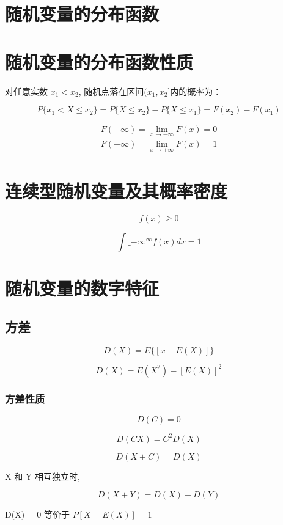 \section{随机变量的分布函数}

\section{随机变量的分布函数性质}

对任意实数 $x_1<x_2$, 随机点落在区间$( x_1 ,  x_2 ]$内的概率为：

$$
P\{ x_1<X  \le  x_2\} =P\{ X  \le   x_2 \} - P\{ X  \le   x_1 \}= F(x_2)-F(x_1)
$$

$$
\begin{array}{l}
F(-\infty)=\lim_{x \rightarrow-\infty} F(x)=0 \\
F(+\infty)=\lim_{x \rightarrow+\infty} F(x)=1
\end{array}
$$

\section{连续型随机变量及其概率密度}

$$ f(x) \geq 0 $$

$$ \int\_{-\infty}^{\infty} f(x) d x=1 $$


\section{随机变量的数字特征}

\subsection{方差}


$$
 D(X) = E \Big\{ [x-E(X)] \Big\}
$$

$$
 D(X) = E(X^2) - [E(X)] ^2
$$

\subsubsection{方差性质}

$$
 D(C) = 0
$$

$$
 D(CX) = C^2D(X)
$$

$$
 D(X+C) = D(X)
$$

X 和 Y 相互独立时,

$$
 D(X+Y) = D(X)+D(Y)
$$

D(X) = 0 等价于 $
 P[X = E(X)] = 1
$


